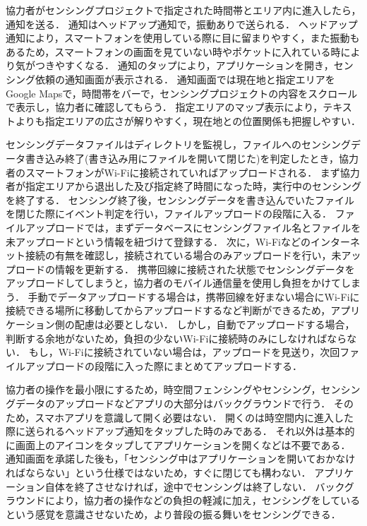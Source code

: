 協力者がセンシングプロジェクトで指定された時間帯とエリア内に進入したら，通知を送る．
通知はヘッドアップ通知で，振動ありで送られる．
ヘッドアップ通知により，スマートフォンを使用している際に目に留まりやすく，また振動もあるため，スマートフォンの画面を見ていない時やポケットに入れている時により気がつきやすくなる．
通知のタップにより，アプリケーションを開き，センシング依頼の通知画面が表示される．
通知画面では現在地と指定エリアをGoogle Mapsで，時間帯をバーで，センシングプロジェクトの内容をスクロールで表示し，協力者に確認してもらう．
指定エリアのマップ表示により，テキストよりも指定エリアの広さが解りやすく，現在地との位置関係も把握しやすい．




センシングデータファイルはディレクトリを監視し，ファイルへのセンシングデータ書き込み終了(書き込み用にファイルを開いて閉じた)を判定したとき，協力者のスマートフォンがWi-Fiに接続されていればアップロードされる．
まず協力者が指定エリアから退出した及び指定終了時間になった時，実行中のセンシングを終了する．
センシング終了後，センシングデータを書き込んでいたファイルを閉じた際にイベント判定を行い，ファイルアップロードの段階に入る．
ファイルアップロードでは，まずデータベースにセンシングファイル名とファイルを未アップロードという情報を紐づけて登録する．
次に，Wi-Fiなどのインターネット接続の有無を確認し，接続されている場合のみアップロードを行い，未アップロードの情報を更新する．
携帯回線に接続された状態でセンシングデータをアップロードしてしまうと，協力者のモバイル通信量を使用し負担をかけてしまう．
手動でデータアップロードする場合は，携帯回線を好まない場合にWi-Fiに接続できる場所に移動してからアップロードするなど判断ができるため，アプリケーション側の配慮は必要としない．
しかし，自動でアップロードする場合，判断する余地がないため，負担の少ないWi-Fiに接続時のみにしなければならない．
もし，Wi-Fiに接続されていない場合は，アップロードを見送り，次回ファイルアップロードの段階に入った際にまとめてアップロードする．

協力者の操作を最小限にするため，時空間フェンシングやセンシング，センシングデータのアップロードなどアプリの大部分はバックグラウンドで行う．
そのため，スマホアプリを意識して開く必要はない．
開くのは時空間内に進入した際に送られるヘッドアップ通知をタップした時のみである．
それ以外は基本的に画面上のアイコンをタップしてアプリケーションを開くなどは不要である．
通知画面を承諾した後も，「センシング中はアプリケーションを開いておかなければならない」という仕様ではないため，すぐに閉じても構わない．
アプリケーション自体を終了させなければ，途中でセンシングは終了しない．
バックグラウンドにより，協力者の操作などの負担の軽減に加え，センシングをしているという感覚を意識させないため，より普段の振る舞いをセンシングできる．


